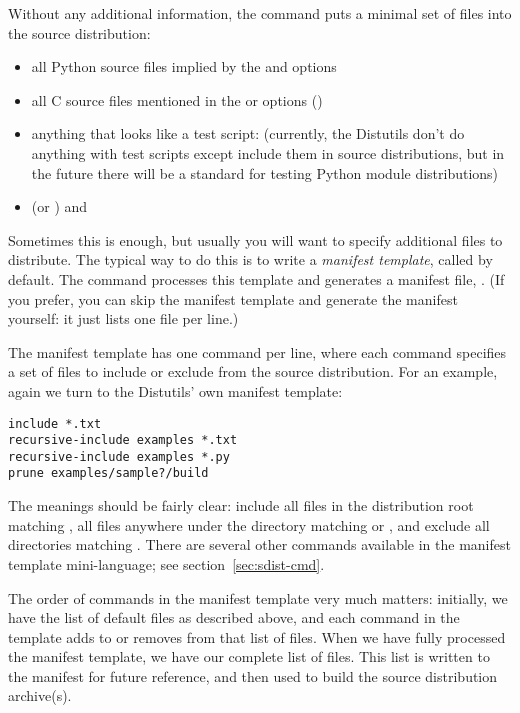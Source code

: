 \documentclass{howto}
\begin{document}
Without any additional information, the  command puts a
minimal set of files into the source distribution:
\begin{itemize}
\item all Python source files implied by the  and
   options
\item all C source files mentioned in the  or
   options ()
\item anything that looks like a test script: 
  (currently, the Distutils don't do anything with test scripts except
  include them in source distributions, but in the future there will be
  a standard for testing Python module distributions)
\item {} (or ) and 
\end{itemize}
Sometimes this is enough, but usually you will want to specify
additional files to distribute.  The typical way to do this is to write
a \emph{manifest template}, called  by default.  The
 command processes this template and generates a manifest
file, .  (If you prefer, you can skip the manifest
template and generate the manifest yourself: it just lists one file per
line.)

The manifest template has one command per line, where each command
specifies a set of files to include or exclude from the source
distribution.  For an example, again we turn to the Distutils' own
manifest template:
\begin{verbatim}
include *.txt
recursive-include examples *.txt
recursive-include examples *.py
prune examples/sample?/build
\end{verbatim}
The meanings should be fairly clear: include all files in the
distribution root matching , all files anywhere under the
 directory matching  or , and
exclude all directories matching .  There
are several other commands available in the manifest template
mini-language; see section~\ref{sec:sdist-cmd}.

The order of commands in the manifest template very much matters:
initially, we have the list of default files as described above, and
each command in the template adds to or removes from that list of files.
When we have fully processed the manifest template, we have our complete
list of files.  This list is written to the manifest for future
reference, and then used to build the source distribution archive(s).
\end{document}
